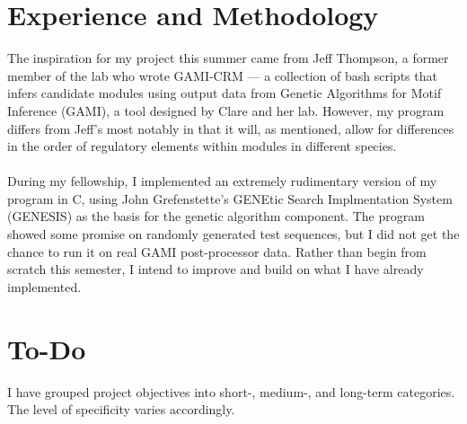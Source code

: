 \documentclass[11pt]{article}
\begin{document}
\section{Experience and Methodology}
The inspiration for my project this summer came from Jeff Thompson, a former member of the lab who wrote GAMI-CRM --- a collection of bash scripts that infers candidate modules using output data from Genetic Algorithms for Motif Inference (GAMI), a tool designed by Clare and her lab. However, my program differs from Jeff's most notably in that it will, as mentioned, allow for differences in the order of regulatory elements within modules in different species.
\\
\\
During my fellowship, I implemented an extremely rudimentary version of my program in C, using John Grefenstette's GENEtic Search Implmentation System (GENESIS) as the basis for the genetic algorithm component. The program showed some promise on randomly generated test sequences, but I did not get the chance to run it on real GAMI post-processor data. Rather than begin from scratch this semester, I intend to improve and build on what I have already implemented.

\section{To-Do}
I have grouped project objectives into short-, medium-, and long-term categories. The level of specificity varies accordingly.
\end{document}
